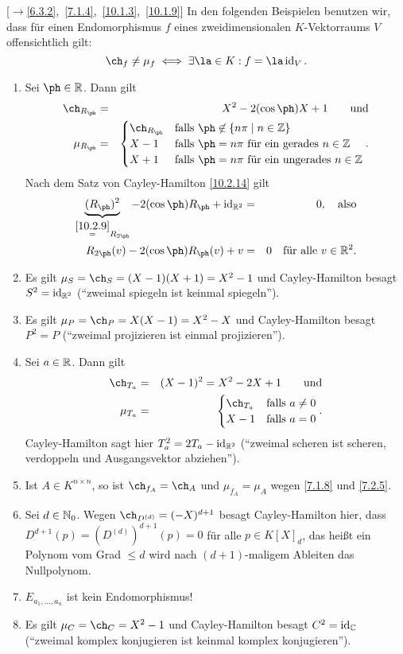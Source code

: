 \documentclass[../../main.tex]{subfiles}
\begin{document}
\begin{bsp}\mbox{}[$\to$\ref{6.3.2},~\ref{7.1.4},~\ref{10.1.3},~\ref{10.1.9}]\label{10.2.20}
In den folgenden Beispielen benutzen wir, dass für einen Endomorphismus $f$ eines zweidimensionalen $K$-Vektorraums $V$ offensichtlich gilt:
\[\ch_f\ne\mu_f\iff\exists\la\in K:f=\la\id_V.\]
\begin{enumerate}[\normalfont(a)]
\item Sei $\ph\in\R$. Dann gilt
\begin{eqnarray*}
\ch_{R_\ph}&=&X^2-2(\cos\ph)X+1\qquad\text{und}\\
\mu_{R_\ph}&=&\begin{cases}\ch_{R_\ph}&\text{falls $\ph\not\in\{n\pi\mid n\in\Z\}$}
\\X-1&\text{falls $\ph=n\pi$ für ein gerades $n\in\Z$}\\
X+1&\text{falls $\ph=n\pi$ für ein ungerades $n\in\Z$}
\end{cases}.
\end{eqnarray*}
Nach dem Satz von Cayley-Hamilton \ref{10.2.14} gilt
\begin{eqnarray*}
\underbrace{(R_\ph)^2}_{\overset{\ref{10.2.9}}=R_{2\ph}}-2(\cos\ph)R_\ph+\id_{\R^2}&=&0,\quad\text{also}\\
R_{2\ph}(v)-2(\cos\ph)R_\ph(v)+v&=&0\quad\text{für alle $v\in\R^2$}.
\end{eqnarray*}
\item Es gilt $\mu_S=\ch_S=(X-1)(X+1)=X^2-1$ und Cayley-Hamilton besagt $S^2=\operatorname{id}_{\mathbb R^2}$ ("`zweimal spiegeln ist keinmal spiegeln"').
\item Es gilt $\mu_P=\ch_P=X(X-1)=X^2-X$ und Cayley-Hamilton besagt $P^2=P$ ("`zweimal projizieren ist einmal projizieren"').
\item Sei $a\in\mathbb R$. Dann gilt
\begin{eqnarray*}
\ch_{T_a}&=&(X-1)^2=X^2-2X+1\qquad\text{und}\\
\mu_{T_a}&=&\begin{cases}\ch_{T_a}&\text{falls $a\ne0$}
\\X-1&\text{falls $a=0$}
\end{cases}.
\end{eqnarray*}
Cayley-Hamilton sagt hier $T_a^2=2T_a-\operatorname{id}_{\mathbb R^2}$ ("`zweimal scheren ist scheren, verdoppeln und Ausgangsvektor abziehen"').
\item Ist $A\in K^{n\times n}$, so ist $\ch_{f_A}=\ch_A$ und $\mu_{f_A}=\mu_A$ wegen \ref{7.1.8} und \ref{7.2.5}.
\item Sei $d\in\mathbb N_0$. Wegen $\ch_{D^{(d)}}=(-X)^{d+1}$ besagt Cayley-Hamilton hier, dass\\
$D^{d+1}(p)=(D^{(d)})^{d+1}(p)=0$ für alle $p\in K[X]_d$, das heißt ein
Polynom vom Grad $\le d$ wird nach $(d+1)$-maligem Ableiten das Nullpolynom.
\item $E_{a_1,\dots,a_n}$ ist kein Endomorphismus!
\item Es gilt $\mu_C=\ch_C=X^2-1$ und Cayley-Hamilton besagt $C^2=\operatorname{id}_\mathbb C$ ("`zweimal komplex konjugieren ist keinmal komplex konjugieren"').
\end{enumerate}
\end{bsp}
\end{document}
